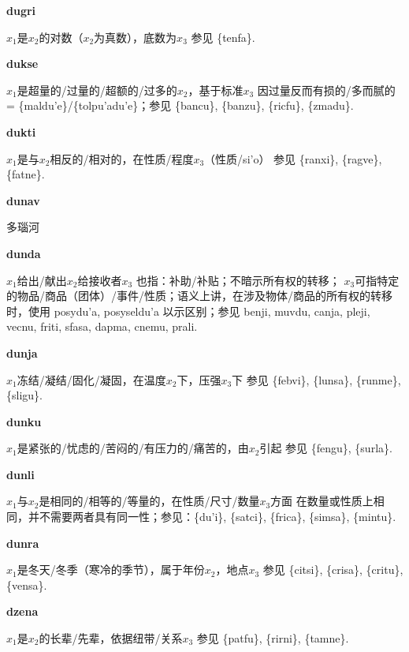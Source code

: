 \documentclass[notitlepage,twocolumn,a4paper,10pt]{book}
\begin{document}
{\sffamily\bfseries dugri}\enspace {\ttfamily\bfseries[dug]}  $x_1$是$x_2$的对数（$x_2$为真数），底数为$x_3$ \textemdash{} 参见 \{tenfa\}.

{\sffamily\bfseries dukse}\enspace {\ttfamily\bfseries[dus     du'e]}  $x_1$是超量的\slash{}过量的\slash{}超额的\slash{}过多的$x_2$，基于标准$x_3$ \textemdash{} 因过量反而有损的\slash{}多而腻的= \{maldu'e\}\slash{}\{tolpu'adu'e\}；参见 \{bancu\}, \{banzu\}, \{ricfu\}, \{zmadu\}.

{\sffamily\bfseries dukti}\enspace {\ttfamily\bfseries[dut]}  $x_1$是与$x_2$相反的\slash{}相对的，在性质\slash{}程度$x_3$（性质\slash{}si'o） \textemdash{} 参见 \{ranxi\}, \{ragve\}, \{fatne\}.

{\sffamily\bfseries dunav} 多瑙河

{\sffamily\bfseries dunda}\enspace {\ttfamily\bfseries[dud     du'a]}  $x_1$给出\slash{}献出$x_2$给接收者$x_3$ \textemdash{} 也指：补助\slash{}补贴；不暗示所有权的转移； $x_3$可指特定的物品\slash{}商品（团体）\slash{}事件\slash{}性质；语义上讲，在涉及物体\slash{}商品的所有权的转移时，使用 {posydu'a}, {posyseldu'a} 以示区别；参见 {benji}, {muvdu}, {canja}, {pleji}, {vecnu}, {friti}, {sfasa}, {dapma}, {cnemu}, {prali}.

{\sffamily\bfseries dunja}\enspace {\ttfamily\bfseries[duj]}  $x_1$冻结\slash{}凝结\slash{}固化\slash{}凝固，在温度$x_2$下，压强$x_3$下 \textemdash{} 参见 \{febvi\}, \{lunsa\}, \{runme\}, \{sligu\}.

{\sffamily\bfseries dunku}\enspace {\ttfamily\bfseries[duk     du'u]}  $x_1$是紧张的\slash{}忧虑的\slash{}苦闷的\slash{}有压力的\slash{}痛苦的，由$x_2$引起 \textemdash{} 参见 \{fengu\}, \{surla\}.

{\sffamily\bfseries dunli}\enspace {\ttfamily\bfseries[dun     du'i]}  $x_1$与$x_2$是相同的\slash{}相等的\slash{}等量的，在性质\slash{}尺寸\slash{}数量$x_3$方面 \textemdash{} 在数量或性质上相同，并不需要两者具有同一性；参见：\{du'i\}, \{satci\}, \{frica\}, \{simsa\}, \{mintu\}.

{\sffamily\bfseries dunra}\enspace {\ttfamily\bfseries[dur]}  $x_1$是冬天\slash{}冬季（寒冷的季节），属于年份$x_2$，地点$x_3$ \textemdash{} 参见 \{citsi\}, \{crisa\}, \{critu\}, \{vensa\}.

{\sffamily\bfseries dzena}\enspace {\ttfamily\bfseries[    dze]}  $x_1$是$x_2$的长辈\slash{}先辈，依据纽带\slash{}关系$x_3$ \textemdash{} 参见 \{patfu\}, \{rirni\}, \{tamne\}.
\end{document}
